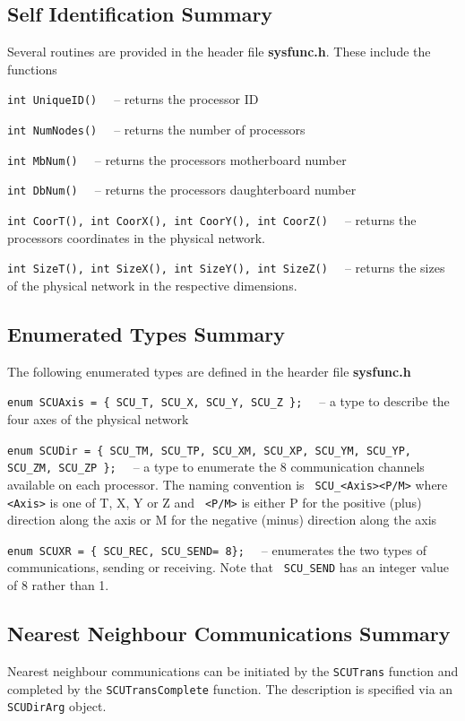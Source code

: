 \subsection{Self Identification Summary}
Several routines are provided in the header file {\bf sysfunc.h}.
These include the functions 
\begin{description}
\item{\tt int UniqueID() \ } -- returns the processor ID
\item{\tt int NumNodes() \ } -- returns the number of processors
\item{\tt int MbNum()    \ } -- returns the processors motherboard number
\item{\tt int DbNum()    \ } -- returns the processors daughterboard number
\item{\tt int CoorT(), int CoorX(), int CoorY(), int CoorZ() \ } -- returns
the processors coordinates in the physical network.
\item{\tt int SizeT(), int SizeX(), int SizeY(), int SizeZ() \ } -- returns
the sizes of the physical network in the respective dimensions.
\end{description}

\subsection{Enumerated Types Summary}
The following enumerated types are defined in the hearder file {\bf sysfunc.h}
\begin{description}
\item{\footnotesize \tt enum SCUAxis = \{ SCU\_T, SCU\_X, SCU\_Y, SCU\_Z \}; \ } -- a type to describe the four axes of the physical network
\item{\footnotesize \tt enum SCUDir = \{ SCU\_TM, SCU\_TP, SCU\_XM, SCU\_XP, SCU\_YM, SCU\_YP, SCU\_ZM, SCU\_ZP \}; \ } -- a type to enumerate the 8 communication
channels available on each processor. The naming convention is {\tt
SCU\_<Axis><P/M>} where {\tt <Axis>} is one of T, X, Y or Z and {\tt
<P/M>} is either P for the positive (plus) direction along the axis or
M for the negative (minus) direction along the axis
\item{\footnotesize \tt enum SCUXR = \{ SCU\_REC, SCU\_SEND= 8\}; \ } -- enumerates
the two types of communications, sending or receiving. Note that {\tt
SCU\_SEND} has an integer value of 8 rather than 1.
\end{description}

\subsection{Nearest Neighbour Communications Summary}
Nearest neighbour communications can be initiated by the {\tt SCUTrans}
function and completed by the {\tt SCUTransComplete} function. The description
is specified via an {\tt SCUDirArg} object.

